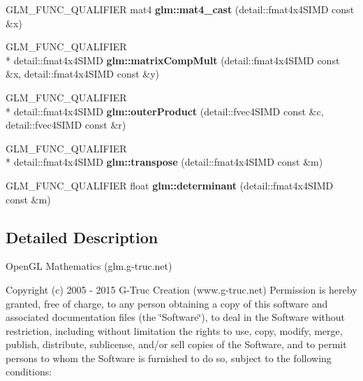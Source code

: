 \begin{DoxyCompactItemize}
\item 
\hypertarget{namespaceglm_aaea24a8e252f68832f4d368be2035889}{G\-L\-M\-\_\-\-F\-U\-N\-C\-\_\-\-Q\-U\-A\-L\-I\-F\-I\-E\-R mat4 {\bfseries glm\-::mat4\-\_\-cast} (detail\-::fmat4x4\-S\-I\-M\-D const \&x)}\label{namespaceglm_aaea24a8e252f68832f4d368be2035889}

\item 
\hypertarget{namespaceglm_a3f8b69f9fddfae106e1a18ad66a17a1a}{G\-L\-M\-\_\-\-F\-U\-N\-C\-\_\-\-Q\-U\-A\-L\-I\-F\-I\-E\-R \\*
detail\-::fmat4x4\-S\-I\-M\-D {\bfseries glm\-::matrix\-Comp\-Mult} (detail\-::fmat4x4\-S\-I\-M\-D const \&x, detail\-::fmat4x4\-S\-I\-M\-D const \&y)}\label{namespaceglm_a3f8b69f9fddfae106e1a18ad66a17a1a}

\item 
\hypertarget{namespaceglm_a24beb25b08989724431540bb9279937c}{G\-L\-M\-\_\-\-F\-U\-N\-C\-\_\-\-Q\-U\-A\-L\-I\-F\-I\-E\-R \\*
detail\-::fmat4x4\-S\-I\-M\-D {\bfseries glm\-::outer\-Product} (detail\-::fvec4\-S\-I\-M\-D const \&c, detail\-::fvec4\-S\-I\-M\-D const \&r)}\label{namespaceglm_a24beb25b08989724431540bb9279937c}

\item 
\hypertarget{namespaceglm_a8a85a6f79193f0789bd2ed17802b70f6}{G\-L\-M\-\_\-\-F\-U\-N\-C\-\_\-\-Q\-U\-A\-L\-I\-F\-I\-E\-R \\*
detail\-::fmat4x4\-S\-I\-M\-D {\bfseries glm\-::transpose} (detail\-::fmat4x4\-S\-I\-M\-D const \&m)}\label{namespaceglm_a8a85a6f79193f0789bd2ed17802b70f6}

\item 
\hypertarget{namespaceglm_a3d33b661dfd45c27b41440cd02605c05}{G\-L\-M\-\_\-\-F\-U\-N\-C\-\_\-\-Q\-U\-A\-L\-I\-F\-I\-E\-R float {\bfseries glm\-::determinant} (detail\-::fmat4x4\-S\-I\-M\-D const \&m)}\label{namespaceglm_a3d33b661dfd45c27b41440cd02605c05}

\end{DoxyCompactItemize}


\subsection{Detailed Description}
Open\-G\-L Mathematics (glm.\-g-\/truc.\-net)

Copyright (c) 2005 -\/ 2015 G-\/\-Truc Creation (www.\-g-\/truc.\-net) Permission is hereby granted, free of charge, to any person obtaining a copy of this software and associated documentation files (the \char`\"{}\-Software\char`\"{}), to deal in the Software without restriction, including without limitation the rights to use, copy, modify, merge, publish, distribute, sublicense, and/or sell copies of the Software, and to permit persons to whom the Software is furnished to do so, subject to the following conditions\-:

